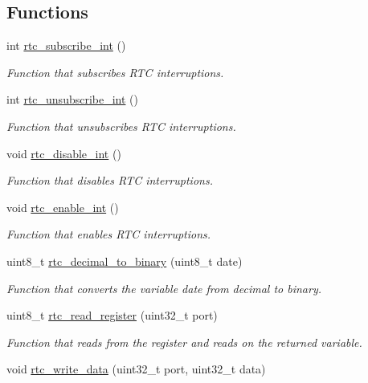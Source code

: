 \subsection*{Functions}
\begin{DoxyCompactItemize}
\item 
int \hyperlink{group__rtc_gabd8de825e876e8ef94c64ac616f68a11}{rtc\+\_\+subscribe\+\_\+int} ()
\begin{DoxyCompactList}\small\item\em Function that subscribes R\+TC interruptions. \end{DoxyCompactList}\item 
int \hyperlink{group__rtc_gab8f17bf5280c908c8b199a90fefcc758}{rtc\+\_\+unsubscribe\+\_\+int} ()
\begin{DoxyCompactList}\small\item\em Function that unsubscribes R\+TC interruptions. \end{DoxyCompactList}\item 
void \hyperlink{group__rtc_ga0f8758bf0df6766696104c3be6c0c6ea}{rtc\+\_\+disable\+\_\+int} ()
\begin{DoxyCompactList}\small\item\em Function that disables R\+TC interruptions. \end{DoxyCompactList}\item 
void \hyperlink{group__rtc_ga8d098a183fdb5fc38da0335041c4d3db}{rtc\+\_\+enable\+\_\+int} ()
\begin{DoxyCompactList}\small\item\em Function that enables R\+TC interruptions. \end{DoxyCompactList}\item 
uint8\+\_\+t \hyperlink{group__rtc_ga862729c9ed50edc422841b6b8bc5aa43}{rtc\+\_\+decimal\+\_\+to\+\_\+binary} (uint8\+\_\+t date)
\begin{DoxyCompactList}\small\item\em Function that converts the variable date from decimal to binary. \end{DoxyCompactList}\item 
uint8\+\_\+t \hyperlink{group__rtc_ga72153103ac037b1a162a9099f001b83c}{rtc\+\_\+read\+\_\+register} (uint32\+\_\+t port)
\begin{DoxyCompactList}\small\item\em Function that reads from the register and reads on the returned variable. \end{DoxyCompactList}\item 
void \hyperlink{group__rtc_gade198e3189c6f8195cde4e404671f980}{rtc\+\_\+write\+\_\+data} (uint32\+\_\+t port, uint32\+\_\+t data)

\end{DoxyCompactItemize}
